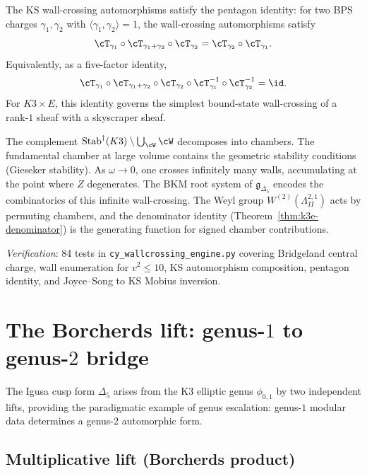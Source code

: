 \begin{proposition}
\label{prop:k3e-pentagon}
The KS wall-crossing automorphisms satisfy the pentagon identity: for two BPS charges $\gamma_1, \gamma_2$ with $\langle \gamma_1, \gamma_2 \rangle = 1$, the wall-crossing automorphisms satisfy
\[
 \cT_{\gamma_1} \circ \cT_{\gamma_1 + \gamma_2} \circ \cT_{\gamma_2} = \cT_{\gamma_2} \circ \cT_{\gamma_1}.
\]
Equivalently, as a five-factor identity,
\[
 \cT_{\gamma_1} \circ \cT_{\gamma_1 + \gamma_2} \circ \cT_{\gamma_2} \circ \cT_{\gamma_1}^{-1} \circ \cT_{\gamma_2}^{-1} = \id.
\]
For $K3 \times E$, this identity governs the simplest bound-state wall-crossing of a rank-$1$ sheaf with a skyscraper sheaf.
\end{proposition}

\begin{remark}
\label{rem:k3e-stab-topology}
The complement $\mathrm{Stab}^\dagger(K3) \setminus \bigcup_{\cW} \cW$ decomposes into chambers. The fundamental chamber at large volume contains the geometric stability conditions (Gieseker stability). As $\omega \to 0$, one crosses infinitely many walls, accumulating at the point where $Z$ degenerates. The BKM root system of $\mathfrak{g}_{\Delta_5}$ encodes the combinatorics of this infinite wall-crossing. The Weyl group $W^{(2)}(\Lambda^{2,1}_{II})$ acts by permuting chambers, and the denominator identity (Theorem~\ref{thm:k3e-denominator}) is the generating function for signed chamber contributions.
\end{remark}

\noindent\textit{Verification}: 84 tests in \texttt{cy\_wallcrossing\_engine.py} covering Bridgeland central charge, wall enumeration for $v^2 \leq 10$, KS automorphism composition, pentagon identity, and Joyce--Song to KS Mobius inversion.



\section{The Borcherds lift: genus-\texorpdfstring{$1$}{1} to genus-\texorpdfstring{$2$}{2} bridge}
\label{sec:k3e-borcherds-lift}

The Igusa cusp form $\Delta_5$ arises from the K3 elliptic genus $\phi_{0,1}$ by two independent lifts, providing the paradigmatic example of genus escalation: genus-$1$ modular data determines a genus-$2$ automorphic form.

\subsection{Multiplicative lift (Borcherds product)}
\label{subsec:k3e-mult-lift}

